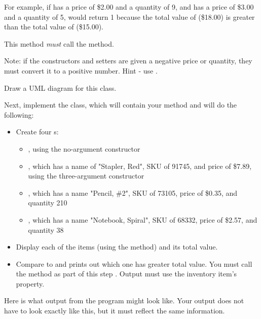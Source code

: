 \begin{exercise}
\begin{itemize}
For example, if  has a price of \$2.00 and a quantity of 9, and  has a price of \$3.00 and a quantity of 5,  would return 1 because the total value of  (\$18.00) is greater than the total value of  (\$15.00).
        
This method {\em must} call the  method.
    
\end{itemize}

Note: if the constructors and setters are given a negative price or quantity, they must convert it to a positive number. Hint - use .

Draw a UML diagram for this class. 

Next, implement the  class, which will contain your  method and will do the following:

\begin{itemize}
    \item Create four s:
        \begin{itemize}
            \item {}, using the no-argument constructor
            \item {}, which has a name of "Stapler, Red", SKU of 91745, and price of \$7.89, using the three-argument constructor
            \item {}, which has a name "Pencil, \#2", SKU of 73105, price of \$0.35, and quantity 210
            \item {}, which has a name "Notebook, Spiral", SKU of 68332, price of \$2.57, and quantity 38
        \end{itemize}
    
    \item Display each of the items (using the  method) and its total value.
    \item Compare  to  and prints out which one has greater total value. You must call the  method as part of this step . Output must use the inventory item's  property.
\end{itemize}

Here is what output from the program might look like. Your output does not have to look exactly like this, but it must reflect the same information.

\end{exercise}

